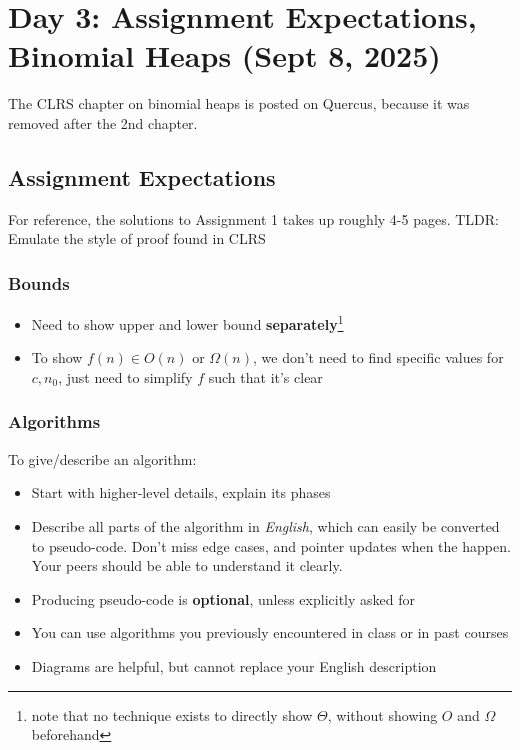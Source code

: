 \section{Day 3: Assignment Expectations, Binomial Heaps (Sept 8, 2025)}

The CLRS chapter on binomial heaps is posted on Quercus, because it was removed after the 2nd chapter.


\subsection{Assignment Expectations}

For reference, the solutions to Assignment 1 takes up roughly 4-5 pages. TLDR: Emulate the style of proof found in CLRS

\subsubsection*{Bounds}
\begin{itemize}
    \item Need to show upper and lower bound \textbf{separately}\footnote{note that no technique exists to directly show $\Theta$, without showing $O$ and $\Omega$ beforehand}
    \item To show $f(n) \in O(n)$ or $\Omega(n)$, we don't need to find specific values for $c, n_0$, just need to simplify $f$ such that it's clear 
\end{itemize}

\subsubsection*{Algorithms}
To give/describe an algorithm:
\begin{itemize}
\item Start with higher-level details, explain its phases
    \item Describe all parts of the algorithm in \textit{English}, which can easily be converted to pseudo-code. Don't miss edge cases, and pointer updates when the happen. Your peers should be able to understand it clearly.
    \item Producing pseudo-code is \textbf{optional}, unless explicitly asked for
    \item You can use algorithms you previously encountered in class or in past courses
    \item Diagrams are helpful, but cannot replace your English description
\end{itemize}

